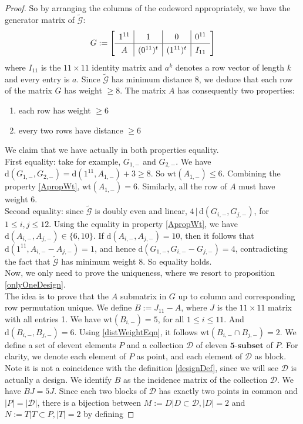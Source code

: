 \documentclass{article}
\numberwithin{equation}{theorem}
\numberwithin{figure}{theorem}
\newcommand{\dDes}{\ensuremath{\mathscr{D}}}
\newcommand{\cCodes}{\ensuremath{\widetilde{\mathscr{G}}}}
\newcommand{\tSubset}[1]{\ensuremath{\bm{#1\mbox{-}{subset}}}}
\newcommand{\wt}[1]{\ensuremath{\text{wt}(#1)}}
\newcommand{\dist}[2]{\ensuremath{\text{d}(#1,#2)}}
\begin{document}
\begin{proof}
So by arranging the columns of the codeword appropriately, we have the generator matrix of \cCodes:
\[
	G := 
\renewcommand\arraystretch{1.3}
\mleft[
\begin{array}{c|c|c|c}
  1^{11} & 1 & 0 & 0^{11} \\
  \hline
  A & (0^{11})^t & (1^{11})^t & I_{11}
\end{array}
\mright]
\]
where $I_{11}$ is the $11 \times 11$ identity matrix and $a^k$ denotes a row vector of length $k$ and every entry is $a$. Since {\cCodes} has minimum distance 8, we deduce that each row
of the matrix $G$ has weight $\geq 8$.
The matrix $A$ has consequently two properties:
\begin{enumerate}
	\item each row has weight $\geq 6$ \label{ApropWt}
	\item every two rows have distance $\geq 6$ \label{ArowDist}
\end{enumerate}
We claim that we have actually in both properties equality.\\
First equality: take for example, $G_{1,-}$ and $G_{2,-}$. We have $\dist{G_{1,-}}{G_{2,-}} = \dist{1^{11}}{A_{1,-}} + 3 \geq 8$. So $\wt{A_{1,-}} \leq 6$. Combining the property \ref{ApropWt}, $\wt{A_{1,-}} = 6$. Similarly, all the row of $A$ must have weight 6.\\
Second equality: since {\cCodes} is doubly even and linear, $4 \,|\, \dist{G_{i,-}}{G_{j,-}}$, for $1 \leq i,j \leq 12$. Using the equality in property \ref{ApropWt}, we have $\dist{A_{i,-}}{A_{j,-}} \in \{ 6, 10 \}$. If $\dist{A_{i,-}}{A_{j,-}} = 10$, then it follows that $\dist{1^{11}}{A_{i,-} - A_{j,-}} = 1$, and hence $\dist{G_{1,-}}{G_{i,-}- G_{j,-}} = 4$, contradicting the fact that {\cCodes} has minimum weight 8. So equality holds.\\
Now, we only need to prove the uniqueness, where we resort to proposition \ref{onlyOneDesign}.\\
The idea is to prove that the $A$ submatrix in $G$ up to column and corresponding row permutation %
unique. We define $B := J_{11} - A$, where $J$ is the $11 \times 11$ matrix with all entries 1. We have $\wt{B_{i,-}} = 5$, for all $1 \leq i \leq 11$. And $\dist{B_{i,-}}{B_{j,-}} = 6$. Using \ref{distWeightEqn}, it follows $\wt{B_{i,-} \cap B_{j,-}} = 2$. We define a set of elevent elements $P$ and a collection {\dDes} of eleven {\tSubset{5}} of $P$. For clarity, we denote each element of $P$ as point, and each element of {\dDes} as block. Note it is not a coincidence with the definition \ref{designDef}, since we will see {\dDes} is actually a design. We identify $B$ as the incidence matrix of the collection {\dDes}. We have $BJ = 5J$. Since each two blocks of {\dDes} has exactly two points in common and $|P| = |\dDes|$, there is a bijection between $M  := {D| D \subset \dDes, |D| = 2}$ and $N := {T|T \subset P, |T| = 2}$ by defining 

\end{proof}
\end{document}
